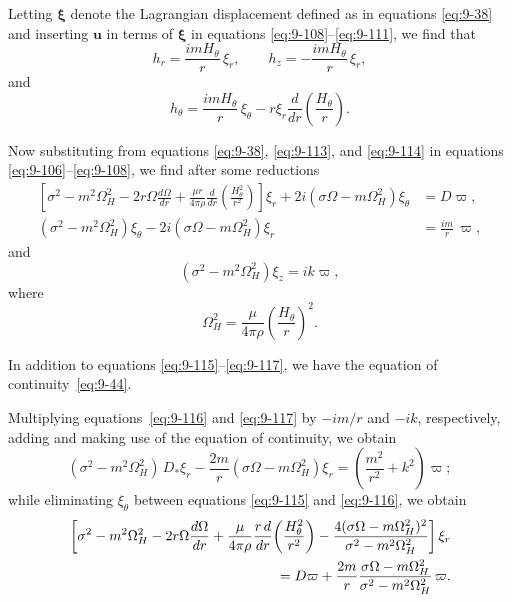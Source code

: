 Letting $\boldsymbol{\xi}$ denote the Lagrangian displacement defined as in equations \eqref{eq:9-38} and inserting $\mathbf{u}$ in terms of $\boldsymbol{\xi}$ in equations \eqref{eq:9-108}--\eqref{eq:9-111}, we find that
\begin{equation}
h_r = \frac{imH_\theta}{r}\, \xi_r, \qquad h_z = -\frac{imH_\theta}{r}\, \xi_r, \label{eq:9-113}
\end{equation}
and
\begin{equation}
h_\theta = \frac{imH_\theta}{r}\, \xi_\theta - r\xi_r \frac{d}{dr}\!\left(\frac{H_\theta}{r}\right). \label{eq:9-114}
\end{equation}

Now substituting from equations \eqref{eq:9-38}, \eqref{eq:9-113}, and \eqref{eq:9-114} in equations \eqref{eq:9-106}--\eqref{eq:9-108}, we find after some reductions
\begin{align}
\left[\sigma^2 - m^2\Omega_H^2 - 2r\Omega\frac{d\Omega}{dr} + \frac{\mu r}{4\pi\rho}\frac{d}{dr}\!\left(\frac{H_\theta^2}{r^2}\right)\right]\xi_r + 2i(\sigma\Omega - m\Omega_H^2)\xi_\theta &= D\varpi, \label{eq:9-115} \\
(\sigma^2 - m^2\Omega_H^2)\xi_\theta - 2i(\sigma\Omega - m\Omega_H^2)\xi_r &= \frac{im}{r}\,\varpi, \label{eq:9-116}
\end{align}
and
\begin{equation}
(\sigma^2 - m^2\Omega_H^2)\xi_z = ik\varpi, \label{eq:9-117}
\end{equation}
where
\begin{equation}
\Omega_H^2 = \frac{\mu}{4\pi\rho}\left(\frac{H_\theta}{r}\right)^2. \label{eq:9-118}
\end{equation}

In addition to equations \eqref{eq:9-115}--\eqref{eq:9-117}, we have the equation of continuity~\eqref{eq:9-44}.

Multiplying equations~\eqref{eq:9-116} and \eqref{eq:9-117} by $-im/r$ and $-ik$, respectively, adding and making use of the equation of continuity, we obtain
\begin{equation}
(\sigma^2 - m^2\Omega_H^2)\, D_*\xi_r - \frac{2m}{r}(\sigma\Omega - m\Omega_H^2)\xi_r = \left(\frac{m^2}{r^2} + k^2\right)\varpi; \label{eq:9-119}
\end{equation}
while eliminating $\xi_\theta$ between equations \eqref{eq:9-115} and \eqref{eq:9-116}, we obtain
\begin{align}
\left[\sigma^2 - m^2\Omega_H^2 - 2r\Omega\frac{d\Omega}{dr} + \frac{\mu}{4\pi\rho}\frac{r\, d}{dr}\!\left(\frac{H_\theta^2}{r^2}\right) - \frac{4(\sigma\Omega - m\Omega_H^2)^2}{\sigma^2 - m^2\Omega_H^2}\right]\xi_r \notag \\
= D\varpi + \frac{2m}{r}\frac{\sigma\Omega - m\Omega_H^2}{\sigma^2 - m^2\Omega_H^2}\,\varpi. \label{eq:9-120}
\end{align}

